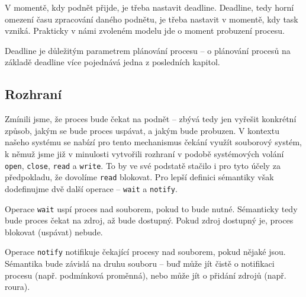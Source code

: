 \documentclass{article}
\begin{document}
V momentě, kdy podnět přijde, je třeba nastavit deadline. Deadline, tedy horní omezení času zpracování daného podnětu, je třeba nastavit v momentě, kdy task vzniká. Prakticky v námi zvoleném modelu jde o moment probuzení procesu.

Deadline je důležitým parametrem plánování procesu -- o plánování procesů na základě deadline více pojednává jedna z posledních kapitol.

\subsection{Rozhraní}

Zmínili jsme, že proces bude čekat na podnět -- zbývá tedy jen vyřešit konkrétní způsob, jakým se bude proces uspávat, a jakým bude probuzen. V kontextu našeho systému se nabízí pro tento mechanismus čekání využít souborový systém, k němuž jsme již v minulosti vytvořili rozhraní v podobě systémových volání \texttt{open}, \texttt{close}, \texttt{read} a \texttt{write}. To by ve své podstatě stačilo i pro tyto účely za předpokladu, že dovolíme \texttt{read} blokovat. Pro lepší definici sémantiky však dodefinujme dvě další operace -- \texttt{wait} a \texttt{notify}.

Operace \texttt{wait} uspí proces nad souborem, pokud to bude nutné. Sémanticky tedy bude proces čekat na zdroj, až bude dostupný. Pokud zdroj dostupný je, proces blokovat (uspávat) nebude.

Operace \texttt{notify} notifikuje čekající procesy nad souborem, pokud nějaké jsou. Sémantika bude závislá na druhu souboru -- buď může jít čistě o notifikaci procesu (např. podmínková proměnná), nebo může jít o přidání zdrojů (např. roura).





\end{document}
